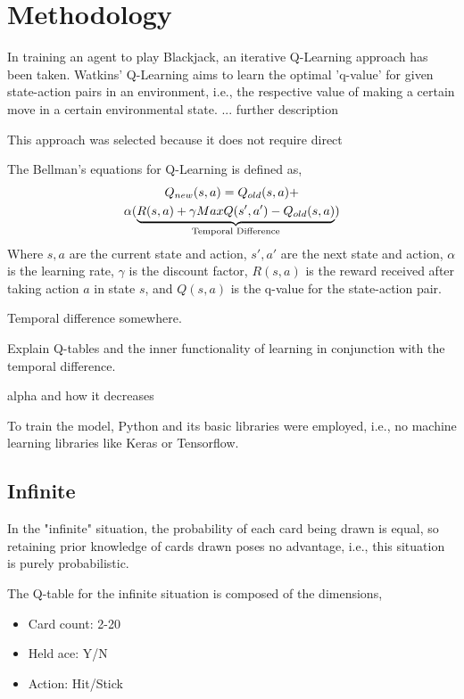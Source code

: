 \section{Methodology}

In training an agent to play Blackjack, an iterative Q-Learning approach has been taken. Watkins' Q-Learning aims to learn the optimal 'q-value' for given state-action pairs in an environment, i.e., the respective value of making a certain move in a certain environmental state. ... further description

This approach was selected because it does not require direct 

The Bellman's equations for Q-Learning is defined as,
\begin{multline}
    Q_{new}(s,a)=Q_{old}(s,a)+\\\alpha(\underbrace{R(s,a)+\gamma MaxQ(s',a')-Q_{old}(s,a)}_{\mathclap{\text{Temporal Difference}}})
\end{multline}
Where \( s, a \) are the current state and action,  \( s', a' \) are the next state and action, \( \alpha \) is the learning rate, \( \gamma \) is the discount factor, \( R(s,a) \) is the reward received after taking action \( a \) in state \( s \), and \( Q(s,a) \) is the q-value for the state-action pair. 



Temporal difference somewhere. 

Explain Q-tables and the inner functionality of learning in conjunction with the temporal difference. 

alpha and how it decreases


To train the model, Python and its basic libraries were employed, i.e., no machine learning libraries like Keras or Tensorflow. 

\subsection{Infinite}

In the "infinite" situation, the probability of each card being drawn is equal, so retaining prior knowledge of cards drawn poses no advantage, i.e., this situation is purely probabilistic. 

The Q-table for the infinite situation is composed of the dimensions, 
\begin{itemize}
    \item Card count: 2-20
    \item Held ace: Y/N
    \item Action: Hit/Stick
\end{itemize}


